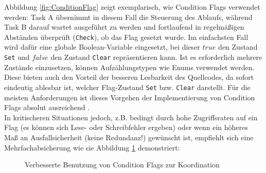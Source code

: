 \documentclass{llncs}
\begin{document}
Abbildung \ref{fig:ConditionFlag} zeigt exemplarisch, wie Condition Flags verwendet werden: Task A übernimmt in diesem Fall die Steuerung des Ablaufs, während Task B darauf wartet ausgeführt zu werden und fortlaufend in regelmäßigen Abständen überprüft (\texttt{Check}), ob das Flag gesetzt wurde. Im einfachsten Fall wird dafür eine globale Boolean-Variable eingesetzt, bei dieser $true$ den Zustand \texttt{Set} und $false$ den Zustand \texttt{Clear} repräsentieren kann. Ist es erforderlich mehrere Zustände einzusetzen, können Aufzählungstypen wie Enums verwendet werden. Diese bieten auch den Vorteil der besseren Lesbarkeit des Quellcodes, da sofort eindeutig ablesbar ist, welcher Flag-Zustand \texttt{Set} bzw. \texttt{Clear} darstellt. Für die meisten Anforderungen ist dieses Vorgehen der Implementierung von Condition Flags absolut ausreichend \autocite[vgl.][84]{Cooling2017}.\\

In kritischeren Situationen jedoch, z.B. bedingt durch hohe Zugriffsraten auf ein Flag (es können sich Lese- oder Schreibfehler ergeben) oder wenn ein höheres Maß an Ausfallsicherheit (keine Redundanz!) gewünscht ist, empfiehlt sich eine Mehrfachabsicherung wie sie Abbildung \ref{fig:ConditionFlag2} demonstriert:

\begin{figure} [h]
	\centering
	\def\svgwidth{300pt}
	
	\caption{\label{fig:ConditionFlag2} Verbesserte Benutzung von Condition Flags zur Koordination \autocite[vgl.][84]{Cooling2017}}
\end{figure}
\end{document}
